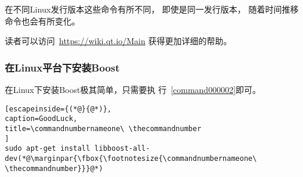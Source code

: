 在不同Linux发行版本这些命令有所不同，
即使是同一发行版本，
随着时间推移命令也会有所变化。

读者可以访问\ \url{https://wiki.qt.io/Main}
获得更加详细的帮助。




\FloatBarrier
\subsubsection{
在Linux平台下安装Boost
}\label{ss000510}



在Linux下安装Boost极其简单，只需要执
行\commandnumbernameone\ \ref{command000002}即可。

{}\label{command000002}    %
\begin{lstlisting}[escapeinside={(*@}{@*)},
caption=GoodLuck,
title=\commandnumbernameone\ \thecommandnumber
]
sudo apt-get install libboost-all-dev(*@\marginpar{\fbox{\footnotesize{\commandnumbernameone\ \thecommandnumber}}}@*)\end{lstlisting}          %
















